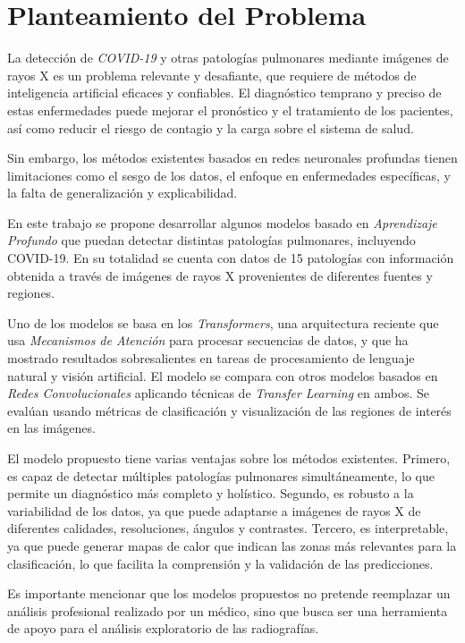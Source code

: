\section{Planteamiento del Problema}

La detección de \textit{COVID-19} y otras patologías pulmonares mediante imágenes de rayos X es un
problema relevante y desafiante, que requiere de métodos de inteligencia artificial eficaces y confiables.
El diagnóstico temprano y preciso de estas enfermedades puede mejorar el pronóstico y el tratamiento
de los pacientes, así como reducir el riesgo de contagio y la carga sobre el sistema de salud.

Sin embargo, los métodos existentes basados en redes neuronales profundas tienen limitaciones como
el sesgo de los datos, el enfoque en enfermedades específicas, y la falta de generalización y
explicabilidad.

En este trabajo se propone desarrollar algunos modelos basado en \textit{Aprendizaje Profundo} que
puedan detectar distintas patologías pulmonares, incluyendo COVID-19. En su totalidad se cuenta con
datos de 15 patologías con información obtenida a través de imágenes de rayos X provenientes de
diferentes fuentes y regiones.

Uno de los modelos se basa en los \textit{Transformers}, una arquitectura reciente que usa
\textit{Mecanismos de Atención} para procesar secuencias de datos, y que ha mostrado resultados
sobresalientes en tareas de procesamiento de lenguaje natural y visión artificial.
El modelo se compara con otros modelos basados en \textit{Redes Convolucionales} aplicando
técnicas de \textit{Transfer Learning} en ambos. Se evalúan usando métricas de clasificación y
visualización de las regiones de interés en las imágenes.

El modelo propuesto tiene varias ventajas sobre los métodos existentes. Primero, es capaz de
detectar múltiples patologías pulmonares simultáneamente, lo que permite un diagnóstico más
completo y holístico. Segundo, es robusto a la variabilidad de los datos, ya que puede adaptarse a
imágenes de rayos X de diferentes calidades, resoluciones, ángulos y contrastes.
Tercero, es interpretable, ya que puede generar mapas de calor que indican las zonas más relevantes
para la clasificación, lo que facilita la comprensión y la validación de las predicciones.

Es importante mencionar que los modelos propuestos no pretende reemplazar un análisis profesional
realizado por un médico, sino que busca ser una herramienta de apoyo para el análisis exploratorio
de las radiografías.

